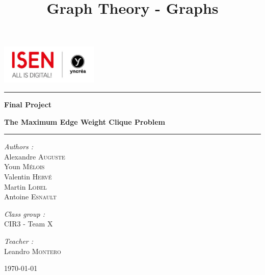 \documentclass{article}
\begin{document}
\title{Graph Theory - Graphs}

\begin{center}
\includegraphics[width=0.35\textwidth]{ISEN.jpg}\\
\end{center}
\rule{\linewidth}{0.5mm}
    
\begin{center}
    {\Huge \bf Final Project}
\end{center}

\begin{center}
    {\LARGE \bf The Maximum Edge Weight Clique Problem}
\end{center}
\rule{\linewidth}{0.5mm}

\vspace{1\baselineskip}
\begin{flushleft} \Large
    \emph{Authors :}\\
    Alexandre \textsc{Auguste}\\
    Youn \textsc{M\'elois}  \\
    Valentin \textsc{Herv\'e}  \\
    Martin \textsc{Lobel}\\
    Antoine \textsc{Esnault} \\
\end{flushleft}

\begin{flushleft} \Large
    \emph{Class group :}\\
    \textsc{CIR3} - Team X \\
\end{flushleft}

\begin{flushleft} \Large
    \emph{Teacher :}\\
    Leandro \textsc{Montero}
\end{flushleft}

\vfill

\begin{center} \Large
    \today
\end{center}

\newpage


\tableofcontents
\newpage
\end{document}
